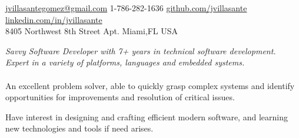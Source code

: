\documentclass[10pt,a4paper]{article}
\begin{document}
\sloppy  %



\nobreakvspace{0.3em}  %

\noindent\href{mailto:jvillasantegomez.at.gmail.dot.com}{jvillasantegomez\mbox{}@\mbox{}gmail.com}\sbull
\textsmaller{+}1-786-282-1636\sbull
\href{https://github.com/jvillasante}{github.com/jvillasante}\sbull
\href{http://linkedin.com/in/jvillasante}{linkedin.com/in/jvillasante}
\\
8405 Northwest 8{\large \sc th} Street {\large \sc Apt.}\sbull
Miami,\thinspace FL\sbull
{\large {}}\sbull
USA

\spacedhrule{0.9em}{-0.4em}  %


\vspace{-1.3em}  %
\begin{multicols}{2}  %
\noindent \emph{Savvy Software Developer with 7+ years in technical software development. Expert in a variety of platforms, languages and embedded systems.}
\\
\\
An excellent problem solver, able to quickly grasp complex systems and identify opportunities for improvements and resolution of critical issues.

Have interest in designing and crafting efficient modern software, and learning new technologies and tools if need arises.
\end{multicols}

\spacedhrule{0em}{-0.4em}

\end{document}
